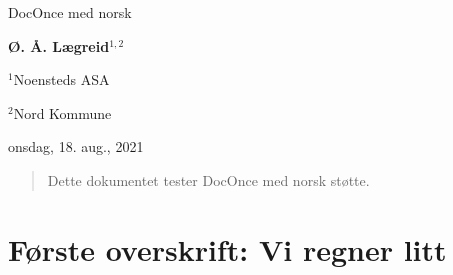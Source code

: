 \documentclass[%
norsk,oneside,                 %
final,                   %
10pt]{article}
\begin{document}

\newcommand{\exercisesection}[1]{\subsection*{#1}}








\thispagestyle{empty}

\begin{center}
{\LARGE\bf
\begin{spacing}{1.25}
DocOnce med norsk
\end{spacing}
}
\end{center}


\begin{center}
{\bf Ø. Å. Lægreid${}^{1, 2}$} \\ [0mm]
\end{center}

\begin{center}
\centerline{{\small ${}^1$Noensteds ASA}}
\centerline{{\small ${}^2$Nord Kommune}}
\end{center}
    

\begin{center}
onsdag, 18. aug., 2021
\end{center}

\vspace{1cm}



\begin{abstract}
Dette dokumentet tester DocOnce med norsk støtte.
\end{abstract}

\tableofcontents

\vspace{1cm} %

\section{Første overskrift: Vi regner litt}
\end{document}
